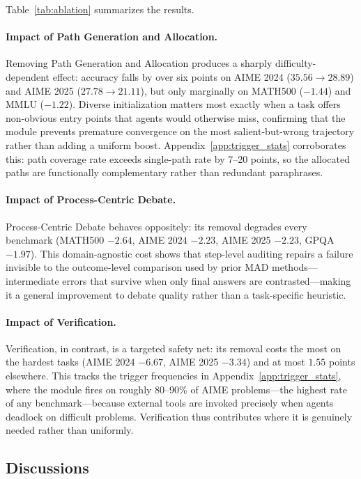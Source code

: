Table~\ref{tab:ablation} summarizes the results.

\paragraph{Impact of Path Generation and Allocation.}
Removing Path Generation and Allocation produces a sharply difficulty-dependent effect: accuracy falls by over six points on AIME 2024 ($35.56 \to 28.89$) and AIME 2025 ($27.78 \to 21.11$), but only marginally on MATH500 ($-1.44$) and MMLU ($-1.22$). Diverse initialization matters most exactly when a task offers non-obvious entry points that agents would otherwise miss, confirming that the module prevents premature convergence on the most salient-but-wrong trajectory rather than adding a uniform boost. Appendix~\ref{app:trigger_stats} corroborates this: path coverage rate exceeds single-path rate by 7--20 points, so the allocated paths are functionally complementary rather than redundant paraphrases.

\paragraph{Impact of Process-Centric Debate.}
Process-Centric Debate behaves oppositely: its removal degrades every benchmark (MATH500 $-2.64$, AIME 2024 $-2.23$, AIME 2025 $-2.23$, GPQA $-1.97$). This domain-agnostic cost shows that step-level auditing repairs a failure invisible to the outcome-level comparison used by prior MAD methods---intermediate errors that survive when only final answers are contrasted---making it a general improvement to debate quality rather than a task-specific heuristic.

\paragraph{Impact of Verification.}
Verification, in contrast, is a targeted safety net: its removal costs the most on the hardest tasks (AIME 2024 $-6.67$, AIME 2025 $-3.34$) and at most $1.55$ points elsewhere. This tracks the trigger frequencies in Appendix~\ref{app:trigger_stats}, where the module fires on roughly 80--90\% of AIME problems---the highest rate of any benchmark---because external tools are invoked precisely when agents deadlock on difficult problems. Verification thus contributes where it is genuinely needed rather than uniformly.

\subsection{Discussions }
\label{sec:analysis}

